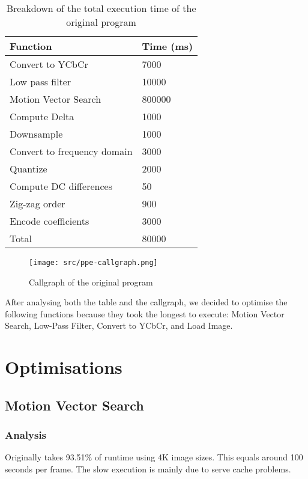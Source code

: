 \documentclass[a4paper]{article}
\begin{document}
\begin{table}[h]
  \centering
  \begin{tabular}{ll}
    \toprule
    Function & Time (ms) \\
    \midrule
    Convert to YCbCr & 7000 \\
    Low pass filter & 10000 \\
    Motion Vector Search & 800000 \\
    Compute Delta &                1000 \\
    Downsample &                   1000 \\
    Convert to frequency domain &  3000 \\
    Quantize &                     2000 \\
    Compute DC differences &       50 \\
    Zig-zag order &                900 \\
    Encode coefficients &          3000 \\
    \midrule
    Total & 80000 \\
    \bottomrule
  \end{tabular}
  \caption{Breakdown of the total execution time of the original
    program}
  \label{tab:vanilla_breakdown}
\end{table}

\begin{figure}[h]
  \centering \texttt{[image: src/ppe-callgraph.png]}
  \caption{Callgraph of the original program}
  \label{fig:vanilla_callgraph}
\end{figure}

After analysing both the table and the callgraph, we decided to
optimise the following functions because they took the longest to
execute: Motion Vector Search, Low-Pass Filter, Convert to YCbCr, and
Load Image.

\section{Optimisations}
\subsection{Motion Vector Search}
\subsubsection{Analysis}
Originally takes 93.51\% of runtime using 4K image sizes. This equals
around 100 seconds per frame. The slow execution is mainly due to
serve cache problems.
\end{document}
